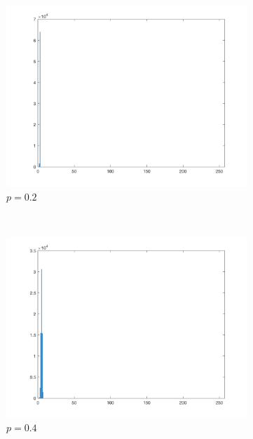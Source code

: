 \documentclass{article}
\begin{document}
\begin{enumerate}[label=(\alph*)]
    \begin{figure}[!htb]
        \centering
        \begin{subfigure}[b]{0.3\textwidth}
            \includegraphics[width=\textwidth]{img/hist_PL02.png}
            \caption{$p = 0.2$}
        \end{subfigure}
        ~
        \begin{subfigure}[b]{0.3\textwidth}
            \includegraphics[width=\textwidth]{img/hist_PL04.png}
            \caption{$p = 0.4$}
        \end{subfigure}
        ~
        \begin{subfigure}[b]{0.3\textwidth}

\end{subfigure}
\end{figure}
\end{enumerate}
\end{document}
